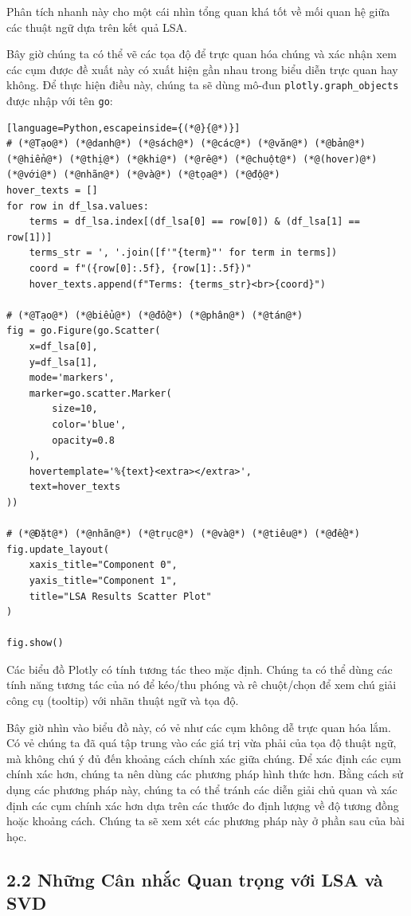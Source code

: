 Phân tích nhanh này cho một cái nhìn tổng quan khá tốt về mối quan hệ giữa các thuật ngữ dựa trên kết quả LSA.

Bây giờ chúng ta có thể vẽ các tọa độ để trực quan hóa chúng và xác nhận xem các cụm được đề xuất này có xuất hiện gần nhau trong biểu diễn trực quan hay không. Để thực hiện điều này, chúng ta sẽ dùng mô-đun \texttt{plotly.graph\_objects} được nhập với tên \texttt{go}:

\begin{lstlisting}[language=Python,escapeinside={(*@}{@*)}]
# (*@Tạo@*) (*@danh@*) (*@sách@*) (*@các@*) (*@văn@*) (*@bản@*) (*@hiển@*) (*@thị@*) (*@khi@*) (*@rê@*) (*@chuột@*) (*@(hover)@*) (*@với@*) (*@nhãn@*) (*@và@*) (*@tọa@*) (*@độ@*)
hover_texts = []
for row in df_lsa.values:
    terms = df_lsa.index[(df_lsa[0] == row[0]) & (df_lsa[1] == row[1])]
    terms_str = ', '.join([f'"{term}"' for term in terms])
    coord = f"({row[0]:.5f}, {row[1]:.5f})"
    hover_texts.append(f"Terms: {terms_str}<br>{coord}")

# (*@Tạo@*) (*@biểu@*) (*@đồ@*) (*@phân@*) (*@tán@*)
fig = go.Figure(go.Scatter(
    x=df_lsa[0],
    y=df_lsa[1],
    mode='markers',
    marker=go.scatter.Marker(
        size=10,
        color='blue',
        opacity=0.8
    ),
    hovertemplate='%{text}<extra></extra>',
    text=hover_texts
))

# (*@Đặt@*) (*@nhãn@*) (*@trục@*) (*@và@*) (*@tiêu@*) (*@đề@*)
fig.update_layout(
    xaxis_title="Component 0",
    yaxis_title="Component 1",
    title="LSA Results Scatter Plot"
)

fig.show()
\end{lstlisting}

Các biểu đồ Plotly có tính tương tác theo mặc định. Chúng ta có thể dùng các tính năng tương tác của nó để kéo/thu phóng và rê chuột/chọn để xem chú giải công cụ (tooltip) với nhãn thuật ngữ và tọa độ.

Bây giờ nhìn vào biểu đồ này, có vẻ như các cụm không dễ trực quan hóa lắm. Có vẻ chúng ta đã quá tập trung vào các giá trị vừa phải của tọa độ thuật ngữ, mà không chú ý đủ đến khoảng cách chính xác giữa chúng. Để xác định các cụm chính xác hơn, chúng ta nên dùng các phương pháp hình thức hơn. Bằng cách sử dụng các phương pháp này, chúng ta có thể tránh các diễn giải chủ quan và xác định các cụm chính xác hơn dựa trên các thước đo định lượng về độ tương đồng hoặc khoảng cách. Chúng ta sẽ xem xét các phương pháp này ở phần sau của bài học.

\subsection*{2.2 Những Cân nhắc Quan trọng với LSA và SVD}


